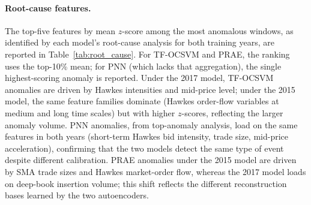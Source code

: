 \documentclass[11pt]{report}
\begin{document}
\paragraph{Root-cause features.}
The top-five features by mean $z$-score among the most anomalous windows, as identified by each model's root-cause analysis for both training years, are reported in Table~\ref{tab:root_cause}.  For TF-OCSVM and PRAE, the ranking uses the top-10\% mean; for PNN (which lacks that aggregation), the single highest-scoring anomaly is reported. Under the 2017 model, TF-OCSVM anomalies are driven by Hawkes intensities and mid-price level; under the 2015 model, the same feature families dominate (Hawkes order-flow variables at medium and long time scales) but with higher $z$-scores, reflecting the larger anomaly volume. PNN anomalies, from top-anomaly analysis, load on the same features in both years (short-term Hawkes bid intensity, trade size, mid-price acceleration), confirming that the two models detect the same type of event despite different calibration. PRAE anomalies under the 2015 model are driven by SMA trade sizes and Hawkes market-order flow, whereas the 2017 model loads on deep-book insertion volume; this shift reflects the different reconstruction bases learned by the two autoencoders.
\end{document}
